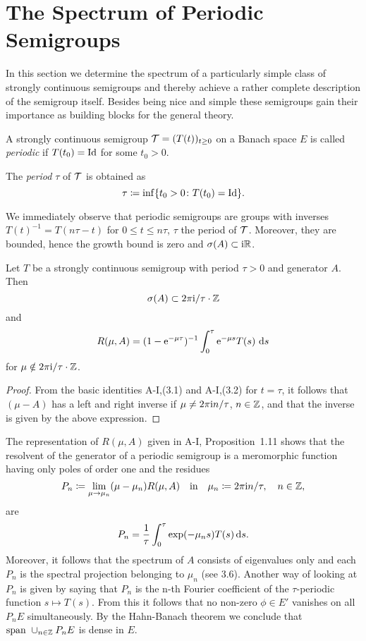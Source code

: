 \section{The Spectrum of Periodic Semigroups} \label{sec:a3-5}%
In this section we determine the spectrum of a particularly simple class of strongly continuous semigroups and thereby achieve a rather complete description of the semigroup itself.
Besides being nice and simple these semigroups gain their importance as building blocks for the general theory.
\begin{definition}\label{def:a3-5.1}
A strongly continuous semigroup $\mathcal{T} = (T(t))_{t \geq 0}$ on a Banach space $E$ is called \emph{periodic} if $T(t_{0}) = \operatorname{Id}$ for some $t_{0} > 0$.

The \emph{period} $\tau$ of $\mathcal{T}$ is obtained as 
%
\[
	\tau \coloneqq \inf\{t_{0} > 0 \colon T(t_{0}) = \operatorname{Id}\} .
\]
%
\end{definition}
We immediately observe that periodic semigroups are groups with inverses $T(t)^{-1} = T(n\tau-t)$ for $0 \leq t \leq n\tau$, $\tau$ the period of $\mathcal{T}$.
Moreover, they are bounded, hence the growth bound is zero and $\sigma(A) \subset \mathrm{i}\mathbb{R}$.
\begin{lemma}\label{lem:a3-5.2}
Let $T$ be a strongly continuous semigroup with period $\tau > 0$ and generator $A$.
Then
\[
\sigma(A) \subset 2\pi \mathrm{i}/\tau\cdot\mathbb{Z}
\]
and
\begin{equation}\label{eq:a3-5.1}
R(\mu,A) = (1-\mathrm{e}^{-\mu\tau})^{-1} \int_{0}^{\tau}\mathrm{e}^{-\mu s}T(s) \, \mathop{}\!\mathrm{d}{s}
\end{equation}
for $\mu \notin 2\pi\mathrm{i} /\tau\cdot\mathbb{Z}$.
\end{lemma}
\begin{proof}
From the basic identities A-I,(3.1) and A-I,(3.2) for $t = \tau$, it follows that $(\mu - A)$ has a left and right inverse if $\mu \neq 2\pi\mathrm{i} n/\tau$, $n \in \mathbb{Z}$, and that the inverse is given by the above expression.
\end{proof}
The representation of $R(\mu,A)$ given in A-I, Proposition~1.11 shows that the resolvent of the generator of a periodic semigroup is a meromorphic function having only poles of order one and the residues
\[
P_{n} \coloneqq \lim_{\mu \to \mu_{n}} (\mu-\mu_{n})R(\mu,A) \quad \text{in} \quad \mu_{n} \coloneqq 2\pi\mathrm{i} n/\tau, \quad n \in \mathbb{Z} ,
\]
are
\begin{equation}\label{eq:a3-5.2}
P_{n} = \frac{1}{\tau}\int_{0}^{\tau}\exp(-\mu_{n}s)T(s)  \mathop{}\!\mathrm{d}{s} .
\end{equation}
Moreover, it follows that the spectrum of $A$ consists of eigenvalues only and each $P_{n}$ is the spectral projection belonging to $\mu_{n}$ (see 3.6). 
Another way of looking at $P_{n}$ is given by saying that $P_{n}$ is the n-th Fourier coefficient of the $\tau$-periodic function $s \mapsto T(s)$.
From this it follows that no non-zero $\phi \in E'$ vanishes on all $P_{n}E$ simultaneously.
By the Hahn-Banach theorem we conclude that $\text{span } \cup_{n \in \mathbb{Z}} P_{n}E$ is dense in $E$.

